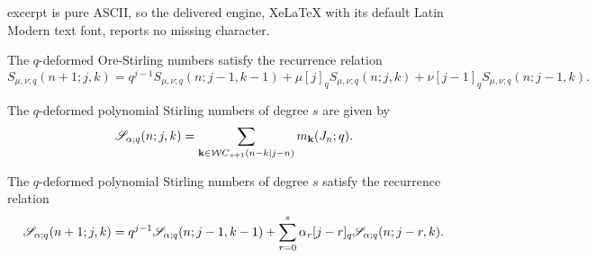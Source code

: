 \documentclass[10pt,a4paper]{amsart}
\begin{document}
excerpt is pure ASCII, so the delivered engine, XeLaTeX with its default Latin Modern text font, reports no missing character.
\begin{proposition}\label{PROPQORESRec} The $q$-deformed Ore-Stirling numbers satisfy the recurrence relation
\begin{equation}\label{QORESRec}
S_{\mu,\nu;q}(n+1;j,k) =q^{j-1}S_{\mu,\nu;q}(n;j-1,k-1)+\mu [j]_q S_{\mu,\nu;q}(n;j,k) +\nu [j-1]_q S_{\mu,\nu;q}(n;j-1,k).  
\end{equation}
\end{proposition}

\begin{proposition} The $q$-deformed polynomial Stirling numbers of degree $s$ are given by 
\begin{equation}\label{PolyStir}
{\mathscr S}_{{\bf \alpha};q}(n;j,k)=\sum_{{\bf k} \in {\mathcal WC}_{s+1}(n-k|j-n)} m_{{\bf k}}(J_n;q).
\end{equation}
\end{proposition}

\begin{proposition}\label{THRECPOLY} The $q$-deformed polynomial Stirling numbers of degree $s$ satisfy the recurrence relation 
\begin{equation}\label{RECPOLY}
{\mathscr S}_{{\bf \alpha};q}(n+1;j,k)=q^{j-1}{\mathscr S}_{{\bf \alpha};q}(n;j-1,k-1)+\sum_{r=0}^s \alpha_r [j-r]_q {\mathscr S}_{{\bf \alpha};q}(n;j-r,k).
\end{equation}
\end{proposition}
\end{document}

